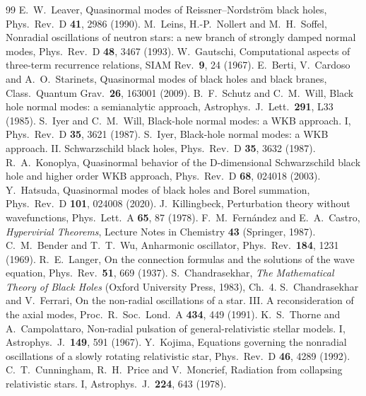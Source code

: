 \documentclass[11pt,a4paper]{article}
\numberwithin{equation}{section}
\begin{document}
\begin{thebibliography}{99}
 E.~W.~Leaver, Quasinormal modes of Reissner--Nordstr\"om black holes, Phys.\ Rev.\ D \textbf{41}, 2986 (1990).
 M.~Leins, H.-P.~Nollert and M.~H.~Soffel, Nonradial oscillations of neutron stars: a new branch of strongly damped normal modes, Phys.\ Rev.\ D \textbf{48}, 3467 (1993).
 W.~Gautschi, Computational aspects of three-term recurrence relations, SIAM Rev.\ \textbf{9}, 24 (1967).
 E.~Berti, V.~Cardoso and A.~O.~Starinets, Quasinormal modes of black holes and black branes, Class.\ Quantum Grav.\ \textbf{26}, 163001 (2009).
 B.~F.~Schutz and C.~M.~Will, Black hole normal modes: a semianalytic approach, Astrophys.\ J.\ Lett.\ \textbf{291}, L33 (1985).
 S.~Iyer and C.~M.~Will, Black-hole normal modes: a WKB approach. I, Phys.\ Rev.\ D \textbf{35}, 3621 (1987).
 S.~Iyer, Black-hole normal modes: a WKB approach. II. Schwarzschild black holes, Phys.\ Rev.\ D \textbf{35}, 3632 (1987).
 R.~A.~Konoplya, Quasinormal behavior of the D-dimensional Schwarzschild black hole and higher order WKB approach, Phys.\ Rev.\ D \textbf{68}, 024018 (2003).
 Y.~Hatsuda, Quasinormal modes of black holes and Borel summation, Phys.\ Rev.\ D \textbf{101}, 024008 (2020).
 J.~Killingbeck, Perturbation theory without wavefunctions, Phys.\ Lett.\ A \textbf{65}, 87 (1978).
 F.~M.~Fern\'andez and E.~A.~Castro, \emph{Hypervirial Theorems}, Lecture Notes in Chemistry \textbf{43} (Springer, 1987).
 C.~M.~Bender and T.~T.~Wu, Anharmonic oscillator, Phys.\ Rev.\ \textbf{184}, 1231 (1969).
 R.~E.~Langer, On the connection formulas and the solutions of the wave equation, Phys.\ Rev.\ \textbf{51}, 669 (1937).
 S.~Chandrasekhar, \emph{The Mathematical Theory of Black Holes} (Oxford University Press, 1983), Ch.~4.
 S.~Chandrasekhar and V.~Ferrari, On the non-radial oscillations of a star. III. A reconsideration of the axial modes, Proc.\ R.\ Soc.\ Lond.\ A \textbf{434}, 449 (1991).
 K.~S.~Thorne and A.~Campolattaro, Non-radial pulsation of general-relativistic stellar models. I, Astrophys.\ J.\ \textbf{149}, 591 (1967).
 Y.~Kojima, Equations governing the nonradial oscillations of a slowly rotating relativistic star, Phys.\ Rev.\ D \textbf{46}, 4289 (1992).
 C.~T.~Cunningham, R.~H.~Price and V.~Moncrief, Radiation from collapsing relativistic stars. I, Astrophys.\ J.\ \textbf{224}, 643 (1978).

\end{thebibliography}
\end{document}
